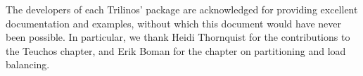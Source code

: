 \documentclass[12pt,relax]{SANDreport}
\begin{document}
\medskip

The developers of each Trilinos' package are acknowledged for providing
excellent documentation and examples, without which this document would
have never been possible. In particular, we thank Heidi Thornquist for
the contributions to the Teuchos chapter, and Erik Boman for the chapter
on partitioning and load balancing.

\clearpage

\SANDmain

\tableofcontents

\clearpage



%

\clearpage
\newpage


\clearpage
\newpage


\clearpage
\newpage


\clearpage
\newpage


\clearpage
\newpage


\clearpage
\newpage


\clearpage
\newpage


\clearpage
\newpage


\clearpage
\newpage


%

\clearpage
\newpage


\clearpage
\newpage




\end{document}
